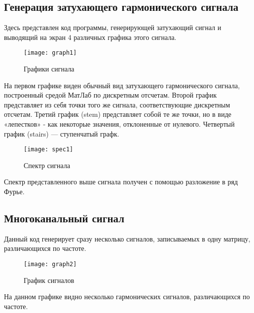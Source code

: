 \subsection{Генерация затухающего гармонического сигнала}


\parindent=1cm
Здесь представлен код программы, генерирующей затухающий сигнал и выводящий на экран 4 различных графика этого сигнала.

\begin{figure}[H]
	\begin{center}
		\texttt{[image: graph1]}
		\caption{Графики сигнала} 
		\label{pic:graph1} %
	\end{center}
\end{figure}
На первом графике виден обычный вид затухающего гармонического сигнала, построенный средой МатЛаб по дискретным отсчетам. Второй график представляет из себя точки того же сигнала, соответствующие дискретным отсчетам. Третий график (stem) представляет собой те же точки, но в виде «лепестков» - как некоторые значения, отклоненные от нулевого. Четвертый график (stairs) — ступенчатый графк.

\begin{figure}[H]
	\begin{center}
		\texttt{[image: spec1]}
		\caption{Спектр сигнала} 
		\label{pic:spec1} %
	\end{center}
\end{figure}
Спектр представленного выше сигнала получен с помощью разложение в ряд Фурье.

\subsection{Многоканальный сигнал}


\parindent=1cm
Данный код генерирует сразу несколько сигналов, записываемых в одну матрицу, различающихся по частоте.

\begin{figure}[H]
	\begin{center}
		\texttt{[image: graph2]}
		\caption{График сигналов} 
		\label{pic:graph2} %
	\end{center}
\end{figure}
На данном графике видно несколько гармонических сигналов, различающихся по частоте.

